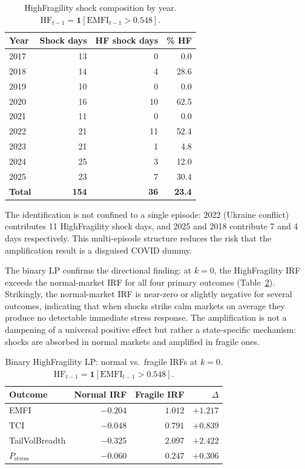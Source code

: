 \documentclass[11pt]{article}
\begin{document}
\begin{table}[h!]
\centering
\small
\caption{HighFragility shock composition by year.
  $\mathrm{HF}_{t-1} = \mathbf{1}[\mathrm{EMFI}_{t-1} > 0.548]$.}
\label{tab:hf_composition}
\begin{tabular}{lrrr}
\hline\hline
Year & Shock days & HF shock days & \% HF \\
\hline
2017 & 13 & 0  & 0.0 \\
2018 & 14 & 4  & 28.6 \\
2019 & 10 & 0  & 0.0 \\
2020 & 16 & 10 & 62.5 \\
2021 & 11 & 0  & 0.0 \\
2022 & 21 & 11 & 52.4 \\
2023 & 21 & 1  & 4.8 \\
2024 & 25 & 3  & 12.0 \\
2025 & 23 & 7  & 30.4 \\
\textbf{Total} & \textbf{154} & \textbf{36} & \textbf{23.4} \\
\hline\hline
\end{tabular}
\end{table}

The identification is not confined to a single episode: 2022 (Ukraine
conflict) contributes 11 HighFragility shock days, and 2025 and 2018
contribute 7 and 4 days respectively. This multi-episode structure
reduces the risk that the amplification result is a disguised COVID
dummy.

The binary LP confirms the directional finding: at $k = 0$, the
HighFragility IRF exceeds the normal-market IRF for all four primary
outcomes (Table~\ref{tab:binary_lp_k0}). Strikingly, the normal-market
IRF is near-zero or slightly negative for several outcomes, indicating
that when shocks strike calm markets on average they produce no
detectable immediate stress response. The amplification is not a
dampening of a universal positive effect but rather a state-specific
mechanism: shocks are absorbed in normal markets and amplified in
fragile ones.

\begin{table}[h!]
\centering
\small
\caption{Binary HighFragility LP: normal vs.\ fragile IRFs at $k=0$.
  $\mathrm{HF}_{t-1} = \mathbf{1}[\mathrm{EMFI}_{t-1} > 0.548]$.}
\label{tab:binary_lp_k0}
\begin{tabular}{lrrr}
\hline\hline
Outcome & Normal IRF & Fragile IRF & $\Delta$ \\
\hline
EMFI             & $-0.204$ & $1.012$ & $+1.217$ \\
TCI              & $-0.048$ & $0.791$ & $+0.839$ \\
TailVolBreadth   & $-0.325$ & $2.097$ & $+2.422$ \\
$P_{\text{stress}}$ & $-0.060$ & $0.247$ & $+0.306$ \\
\hline\hline
\end{tabular}
\end{table}
\end{document}
